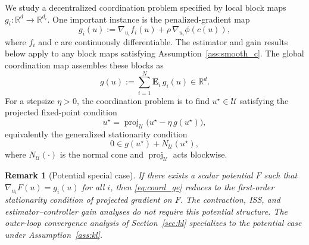 \documentclass[letterpaper, 10 pt, conference]{ieeeconf} %
\newtheorem{remark}{Remark}
\DeclareMathOperator{\proj}{proj}
\begin{document}
We study a decentralized coordination problem specified by local block maps \(g_i:\mathbb R^d\to\mathbb R^{d_i}\). One important instance is the penalized-gradient map
\begin{equation}\label{eq:coord_map_local}
g_i(u):=\nabla_{u_i}f_i(u)
+\rho\,\nabla_{u_i}\phi(c(u)),
\end{equation}
where \(f_i\) and \(c\) are continuously differentiable. The estimator and gain results below apply to any block maps satisfying Assumption~\ref{ass:smooth_c}. The global coordination map assembles these blocks as
\begin{equation}\label{eq:coord_map}
g(u):=\sum_{i=1}^N \mathbf{E}_i\, g_i(u)\in\mathbb{R}^d.
\end{equation}
For a stepsize \(\eta>0\), the coordination problem is to find \(u^\star\in\mathcal U\) satisfying the projected fixed-point condition
\begin{equation}\label{eq:coord_fp}
u^\star=\proj_{\mathcal{U}}\!\big(u^\star-\eta\,g(u^\star)\big),
\end{equation}
equivalently the generalized stationarity condition
\begin{equation}\label{eq:coord_ge}
0\in g(u^\star)+N_{\mathcal{U}}(u^\star),
\end{equation}
where $N_{\mathcal{U}}(\cdot)$ is the normal cone and $\proj_{\mathcal{U}}$ acts blockwise.

\begin{remark}[Potential special case]\label{rem:pot_special}
If there exists a scalar potential $F$ such that $\nabla_{u_i}F(u)=g_i(u)$ for all $i$, then \eqref{eq:coord_ge} reduces to the first-order stationarity condition of projected gradient on $F$. The contraction, ISS, and estimator--controller gain analyses do not require this potential structure. The outer-loop convergence analysis of Section~\ref{sec:kl} specializes to the potential case under Assumption~\ref{ass:kl}.
\end{remark}
\end{document}
